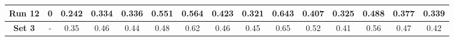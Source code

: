 \begin{table}[!ht]
{\begin{tabular}{|c|c|ccc|ccc|ccc|c|c|c|c|}
		\textbf{Run 12} & 0 & \multicolumn{1}{c|}{0.242} & \multicolumn{1}{c|}{0.334} & 0.336 & \multicolumn{1}{c|}{\textbf{0.551}} & \multicolumn{1}{c|}{0.564} & 0.423 & \multicolumn{1}{c|}{0.321} & \multicolumn{1}{c|}{0.643} & 0.407 & 0.325 & 0.488 & 0.377 & 0.339 \\
		
		\hline
		
		\textbf{Set 3} & - & \multicolumn{1}{c|}{0.35} & \multicolumn{1}{c|}{0.46} & 0.44 & \multicolumn{1}{c|}{0.48} & \multicolumn{1}{c|}{0.62} & 0.46 & \multicolumn{1}{c|}{0.45} & \multicolumn{1}{c|}{0.65} & 0.52 & 0.41 & 0.56 & 0.47 & 0.42 \\
		
		\hline
					
	\end{tabular}}
	\label{tab:Experiment1.2Results}
\end{table}

